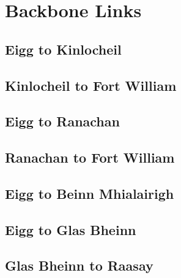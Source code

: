 \section{Backbone Links}

\clearpage
\subsection{Eigg to Kinlocheil}
\begin{figure}[h]
  
\end{figure}

\clearpage
\subsection{Kinlocheil to Fort William}
\begin{figure}[h]
  
\end{figure}

\clearpage
\subsection{Eigg to Ranachan}
\begin{figure}[h]
  
\end{figure}

\clearpage
\subsection{Ranachan to Fort William}
\begin{figure}[h]
  
\end{figure}

\clearpage
\subsection{Eigg to Beinn Mhialairigh}
\begin{figure}[h]
  
\end{figure}

\clearpage
\subsection{Eigg to Glas Bheinn}
\begin{figure}[h]
  
\end{figure}

\clearpage
\subsection{Glas Bheinn to Raasay}
\begin{figure}[h]
  
\end{figure}
